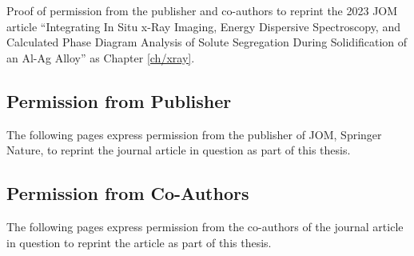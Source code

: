 
Proof of permission from the publisher and co-authors to reprint
the 2023 JOM article
``Integrating In Situ x-Ray Imaging, Energy Dispersive
Spectroscopy, and Calculated Phase Diagram Analysis
of Solute Segregation During Solidification of an Al-Ag Alloy''
\cite{Becker2021}
as Chapter \ref{ch/xray}.

\subsection{Permission from Publisher}
The following pages express permission from the publisher of JOM,
Springer Nature, to reprint the journal article in question as part of
this thesis.
\newpage


\subsection{Permission from Co-Authors}
The following pages express permission from the co-authors of the
journal article in question to reprint the article as part of this thesis.
\newpage








